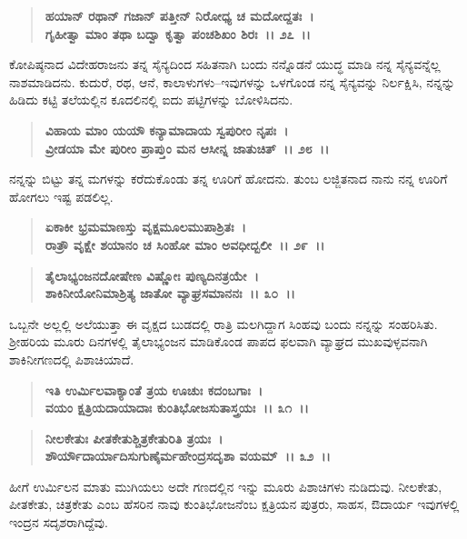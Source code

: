 \begin{verse}
\textbf{ಹಯಾನ್ ರಥಾನ್ ಗಜಾನ್ ಪತ್ತೀನ್ ನಿರೋಧ್ಯ ಚ ಮದೋದ್ದತಃ~।}\\\textbf{ಗೃಹೀತ್ವಾ ಮಾಂ ತಥಾ ಬದ್ವಾ ಕೃತ್ವಾ ಪಂಚಶಿಖಂ ಶಿರಃ~।। ೨೭~।।} 
\end{verse}

ಕೋಪಿಷ್ಠನಾದ ವಿದೇಹರಾಜನು ತನ್ನ ಸೈನ್ಯದಿಂದ ಸಹಿತನಾಗಿ ಬಂದು ನನ್ನೊಡನೆ ಯುದ್ಧ ಮಾಡಿ ನನ್ನ ಸೈನ್ಯವನ್ನೆಲ್ಲ ನಾಶಮಾಡಿದನು. ಕುದುರೆ, ರಥ, ಆನೆ, ಕಾಲಾಳುಗಳು–ಇವುಗಳನ್ನು ಒಳಗೊಂಡ ನನ್ನ ಸೈನ್ಯವನ್ನು ನಿರ್ಲಕ್ಷಿಸಿ, ನನ್ನನ್ನು ಹಿಡಿದು ಕಟ್ಟಿ ತಲೆಯಲ್ಲಿನ ಕೂದಲಿನಲ್ಲಿ ಐದು ಪಟ್ಟಿಗಳನ್ನು ಬೋಳಿಸಿದನು.

\begin{verse}
\textbf{ವಿಹಾಯ ಮಾಂ ಯಯೌ ಕನ್ಯಾಮಾದಾಯ ಸ್ವಪುರೀಂ ನೃಪಃ~।}\\\textbf{ವ್ರೀಡಯಾ ಮೇ ಪುರೀಂ ಪ್ರಾಪ್ತುಂ ಮನ ಆಸೀನ್ನ ಜಾತುಚಿತ್~।। ೨೮~।।} 
\end{verse}

ನನ್ನನ್ನು ಬಿಟ್ಟು ತನ್ನ ಮಗಳನ್ನು ಕರೆದುಕೊಂಡು ತನ್ನ ಊರಿಗೆ ಹೋದನು. ತುಂಬ ಲಜ್ಜಿತ\-ನಾದ ನಾನು ನನ್ನ ಊರಿಗೆ ಹೋಗಲು ಇಷ್ಟ ಪಡಲಿಲ್ಲ.

\begin{verse}
\textbf{ಏಕಾಕೀ ಭ್ರಮಮಾಣಸ್ತು ವೃಕ್ಷಮೂಲಮುಪಾಶ್ರಿತಃ~।}\\\textbf{ರಾತ್ರೌ ವೃಕ್ಷೇ ಶಯಾನಂ ಚ ಸಿಂಹೋ ಮಾಂ ಅವಧೀದ್ಬಲೀ~।। ೨೯~।। }
\end{verse}

\begin{verse}
\textbf{ತೈಲಾಭ್ಯಂಜನದೋಷೇಣ ವಿಷ್ಣೋಃ ಪುಣ್ಯದಿನತ್ರಯೇ~।}\\\textbf{ಶಾಕಿನೀಯೋನಿಮಾಶ್ರಿತ್ಯ ಜಾತೋ ವ್ಯಾಘ್ರಸಮಾನನಃ~।। ೩೦~।।} 
\end{verse}

ಒಬ್ಬನೇ ಅಲ್ಲಲ್ಲಿ ಅಲೆಯುತ್ತಾ ಈ ವೃಕ್ಷದ ಬುಡದಲ್ಲಿ ರಾತ್ರಿ ಮಲಗಿದ್ದಾಗ ಸಿಂಹವು ಬಂದು ನನ್ನನ್ನು ಸಂಹರಿಸಿತು. ಶ‍್ರೀಹರಿಯ ಮೂರು ದಿನಗಳಲ್ಲಿ ತೈಲಾಭ್ಯಂಜನ ಮಾಡಿಕೊಂಡ ಪಾಪದ ಫಲವಾಗಿ ವ್ಯಾಘ್ರದ ಮುಖವುಳ್ಳವನಾಗಿ ಶಾಕಿನೀಗಣದಲ್ಲಿ ಪಿಶಾಚಿಯಾದೆ.

\begin{verse}
\textbf{ಇತಿ ಉರ್ಮಿಲವಾಕ್ಯಾಂತೆ ತ್ರಯ ಊಚುಃ ಕದಂಬಗಾಃ~।}\\\textbf{ವಯಂ ಕ್ಷತ್ರಿಯದಾಯಾದಾಃ ಕುಂತಿಭೋಜಸುತಾಸ್ತ್ರಯಃ~।। ೩೧~।। }
\end{verse}

\begin{verse}
\textbf{ನೀಲಕೇತುಃ ಪೀತಕೇತುಶ್ಚಿತ್ರಕೇತುರಿತಿ ತ್ರಯಃ~।}\\\textbf{ಶೌರ್ಯೌದಾರ್ಯಾದಿಸುಗುಣೈರ್ಮಹೇಂದ್ರಸದೃಶಾ ವಯಮ್~।। ೩೨~।। }
\end{verse}

ಹೀಗೆ ಉರ್ಮಿಲನ ಮಾತು ಮುಗಿಯಲು ಅದೇ ಗಣದಲ್ಲಿನ ಇನ್ನು ಮೂರು ಪಿಶಾಚಿಗಳು ನುಡಿದುವು. ನೀಲಕೇತು, ಪೀತಕೇತು, ಚಿತ್ರಕೇತು ಎಂಬ ಹೆಸರಿನ ನಾವು ಕುಂತಿಭೋಜನೆಂಬ ಕ್ಷತ್ರಿಯನ ಪುತ್ರರು, ಸಾಹಸ, ಔದಾರ್ಯ ಇವುಗಳಲ್ಲಿ ಇಂದ್ರನ ಸದೃಶರಾಗಿದ್ದೆವು.

